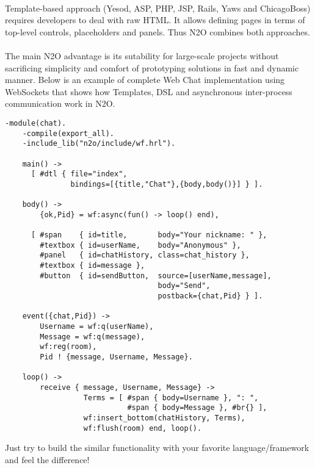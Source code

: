 \paragraph{}
Template-based approach (Yesod, ASP, PHP, JSP, Rails, Yaws and ChicagoBoss)
requires developers to deal with raw HTML. It allows
defining pages in terms of top-level controls, placeholders
and panels. Thus N2O combines both approaches.

\paragraph{}
The main N2O advantage is its sutability for large-scale projects without sacrificing simplicity and comfort of prototyping solutions in fast and dynamic manner.
Below is an example of complete Web Chat implementation using
WebSockets that shows how  Templates, DSL and asynchronous
inter-process communication work in N2O.

\newpage
\vspace{1\baselineskip}
\begin{lstlisting}[caption=chat.erl]
    -module(chat).
    -compile(export_all).
    -include_lib("n2o/include/wf.hrl").

    main() ->
      [ #dtl { file="index",
               bindings=[{title,"Chat"},{body,body()}] } ].

    body() ->
        {ok,Pid} = wf:async(fun() -> loop() end),

      [ #span    { id=title,       body="Your nickname: " },
        #textbox { id=userName,    body="Anonymous" },
        #panel   { id=chatHistory, class=chat_history },
        #textbox { id=message },
        #button  { id=sendButton,  source=[userName,message],
                                   body="Send",
                                   postback={chat,Pid} } ].

    event({chat,Pid}) ->
        Username = wf:q(userName),
        Message = wf:q(message),
        wf:reg(room),
        Pid ! {message, Username, Message}.

    loop() ->
        receive { message, Username, Message} ->
                  Terms = [ #span { body=Username }, ": ",
                            #span { body=Message }, #br{} ],
                  wf:insert_bottom(chatHistory, Terms),
                  wf:flush(room) end, loop().
\end{lstlisting}
\vspace{1\baselineskip}

Just try to build the similar functionality with your favorite language/framework and feel the difference!

